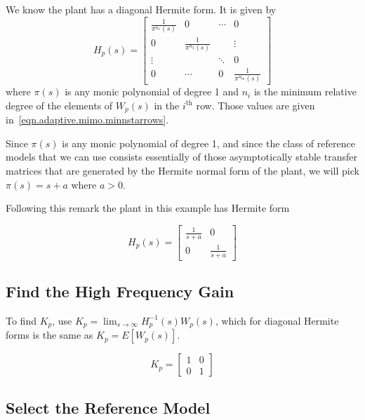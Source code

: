 We know the plant has a diagonal Hermite form.
It is given by
\begin{equation*}
  H_{p}(s)=
  \begin{bmatrix}
    \frac{1}{\pi^{n_{1}}(s)} & 0 &  \cdots & 0 \\
    0 & \frac{1}{\pi^{n_{2}}(s)} & & \vdots \\
    \vdots & & \ddots & 0 \\
    0 & \cdots & 0 & \frac{1}{\pi^{n_{m}}(s)}
  \end{bmatrix}
\end{equation*}
where $\pi(s)$ is any monic polynomial of degree 1 and $n_{i}$ is the minimum relative degree of the elements of $W_{p}(s)$ in the $i^{\text{th}}$ row.
Those values are given in~\eqref{eqn.adaptive.mimo.minnstarrows}.

\begin{rem-dan}
  Since $\pi(s)$ is any monic polynomial of degree 1, and since the class of reference models that we can use consists essentially of those asymptotically stable transfer matrices that are generated by the Hermite normal form of the plant, we will pick $\pi(s)=s+a$ where $a>0$.
\end{rem-dan}

Following this remark the plant in this example has Hermite form

\begin{equation}\label{eqn.adaptive.mimo.hp}
  H_{p}(s)=
  \begin{bmatrix}
    \frac{1}{s+a} & 0 \\
    0 & \frac{1}{s+a}
  \end{bmatrix}
\end{equation}

\subsection{Find the High Frequency Gain}

To find $K_{p}$, use $K_{p}=\lim_{s\rightarrow\infty}H_{p}^{-1}(s)W_{p}(s)$, which for diagonal Hermite forms is the same as $K_{p}=E[W_{p}(s)]$.

\begin{equation*}
  K_{p}=
  \begin{bmatrix}
    1 & 0 \\
    0 & 1
  \end{bmatrix}
\end{equation*}

\subsection{Select the Reference Model}


